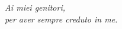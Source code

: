 \begin{titlepage}

\nonumber
\null {}
	\begin{flushright}
\textit{Ai miei genitori,\\per aver sempre creduto in me.} \\[5mm]
	\end{flushright}



\end{titlepage}